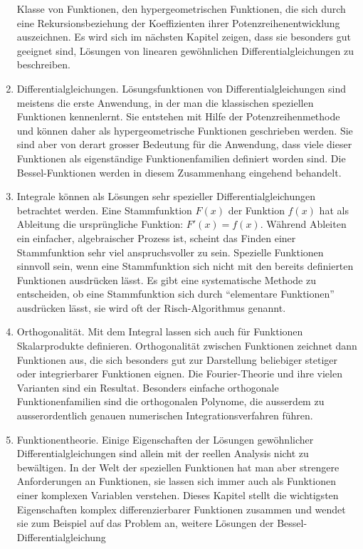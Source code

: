 \begin{enumerate}
Klasse von Funktionen, den hypergeometrischen Funktionen, die sich
durch eine Rekursionsbeziehung der Koeffizienten ihrer
Potenzreihenentwicklung auszeichnen.
Es wird sich im nächsten Kapitel zeigen, dass sie besonders gut
geeignet sind, Lösungen von linearen gewöhnlichen Differentialgleichungen zu
beschreiben.
\item
Differentialgleichungen.
Lösungsfunktionen von Differentialgleichungen sind meistens die
erste Anwendung, in der man die klassischen speziellen Funktionen
kennenlernt.
Sie entstehen mit Hilfe der Potenzreihenmethode und können daher
als hypergeometrische Funktionen geschrieben werden.
Sie sind aber von derart grosser Bedeutung für die Anwendung,
dass viele dieser Funktionen als eigenständige Funktionenfamilien
definiert worden sind.
Die Bessel-Funktionen werden in diesem Zusammenhang eingehend
behandelt.
\item
Integrale können als Lösungen sehr spezieller Differentialgleichungen
betrachtet werden.
Eine Stammfunktion $F(x)$ der Funktion $f(x)$ hat als Ableitung die
ursprüngliche Funktion: $F'(x)=f(x)$.
Während Ableiten ein einfacher, algebraischer Prozess ist, 
scheint das Finden einer Stammfunktion sehr viel anspruchsvoller
zu sein.
Spezielle Funktionen sinnvoll sein, wenn eine Stammfunktion sich nicht
mit den bereits definierten Funktionen ausdrücken lässt.
Es gibt eine systematische Methode zu entscheiden, ob eine Stammfunktion
sich durch ``elementare Funktionen'' ausdrücken lässt, sie wird oft
der Risch-Algorithmus genannt.
\item
Orthogonalität.
Mit dem Integral lassen sich auch für Funktionen Skalarprodukte
definieren.
Orthogonalität zwischen Funktionen zeichnet dann Funktionen aus, die
sich besonders gut zur Darstellung beliebiger stetiger oder
integrierbarer Funktionen eignen.
Die Fourier-Theorie und ihre vielen Varianten sind ein Resultat.
Besonders einfache orthogonale Funktionenfamilien sind die orthogonalen
Polynome, die ausserdem zu ausserordentlich genauen numerischen
Integrationsverfahren führen.
\item
Funktionentheorie.
Einige Eigenschaften der Lösungen gewöhnlicher Differentialgleichungen
sind allein mit der reellen Analysis nicht zu bewältigen.
In der Welt der speziellen Funktionen hat man aber strengere
Anforderungen an Funktionen, sie lassen sich immer auch als Funktionen
einer komplexen Variablen verstehen.
Dieses Kapitel stellt die wichtigsten Eigenschaften komplex
differenzierbarer Funktionen zusammen und wendet sie zum Beispiel
auf das Problem an, weitere Lösungen der Bessel-Differentialgleichung

\end{enumerate}
